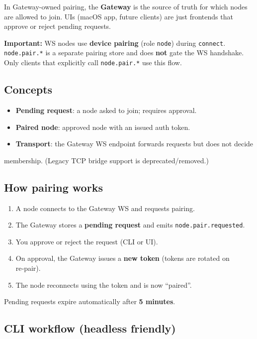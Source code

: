 In Gateway-owned pairing, the \textbf{Gateway} is the source of truth for which nodes
are allowed to join. UIs (macOS app, future clients) are just frontends that
approve or reject pending requests.

\textbf{Important:} WS nodes use \textbf{device pairing} (role \texttt{node}) during \texttt{connect}.
\texttt{node.pair.*} is a separate pairing store and does \textbf{not} gate the WS handshake.
Only clients that explicitly call \texttt{node.pair.*} use this flow.

\subsection{Concepts}


\begin{itemize}
  \item \textbf{Pending request}: a node asked to join; requires approval.
  \item \textbf{Paired node}: approved node with an issued auth token.
  \item \textbf{Transport}: the Gateway WS endpoint forwards requests but does not decide
\end{itemize}

membership. (Legacy TCP bridge support is deprecated/removed.)

\subsection{How pairing works}


\begin{enumerate}
  \item A node connects to the Gateway WS and requests pairing.
  \item The Gateway stores a \textbf{pending request} and emits \texttt{node.pair.requested}.
  \item You approve or reject the request (CLI or UI).
  \item On approval, the Gateway issues a \textbf{new token} (tokens are rotated on re‑pair).
  \item The node reconnects using the token and is now “paired”.
\end{enumerate}


Pending requests expire automatically after \textbf{5 minutes}.

\subsection{CLI workflow (headless friendly)}



